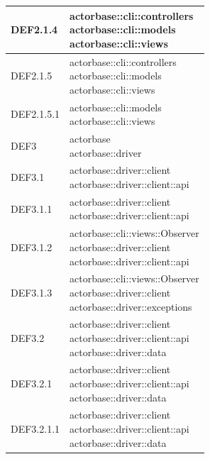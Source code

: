 \documentclass{scalatekids-article}
\begin{document}
\begin{longtable}[H]{|p{6cm}|p{11cm}|}
\hline
DEF2.1.4 & \multiLineCell[t]{actorbase::cli::controllers\\actorbase::cli::models\\actorbase::cli::views\\}\\
\hline
DEF2.1.5 & \multiLineCell[t]{actorbase::cli::controllers\\actorbase::cli::models\\actorbase::cli::views\\}\\
\hline
DEF2.1.5.1 & \multiLineCell[t]{actorbase::cli::models\\actorbase::cli::views\\}\\
\hline
DEF3 & \multiLineCell[t]{actorbase\\actorbase::driver\\}\\
\hline
DEF3.1 & \multiLineCell[t]{actorbase::driver::client\\actorbase::driver::client::api\\}\\
\hline
DEF3.1.1 & \multiLineCell[t]{actorbase::driver::client\\actorbase::driver::client::api\\}\\
\hline
DEF3.1.2 & \multiLineCell[t]{actorbase::cli::views::Observer\\actorbase::driver::client\\actorbase::driver::client::api\\}\\
\hline
DEF3.1.3 & \multiLineCell[t]{actorbase::cli::views::Observer\\actorbase::driver::client\\actorbase::driver::exceptions\\}\\
\hline
DEF3.2 & \multiLineCell[t]{actorbase::driver::client\\actorbase::driver::client::api\\actorbase::driver::data\\}\\
\hline
DEF3.2.1 & \multiLineCell[t]{actorbase::driver::client\\actorbase::driver::client::api\\actorbase::driver::data\\}\\
\hline
DEF3.2.1.1 & \multiLineCell[t]{actorbase::driver::client\\actorbase::driver::client::api\\actorbase::driver::data\\}\\

\end{longtable}
\end{document}
